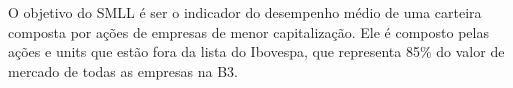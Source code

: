 O objetivo do SMLL é ser o indicador do desempenho médio de uma carteira composta por ações de empresas de menor capitalização. Ele é composto pelas ações e units que estão fora da lista do Ibovespa, que representa 85\% do valor de mercado de todas as empresas na B3.



